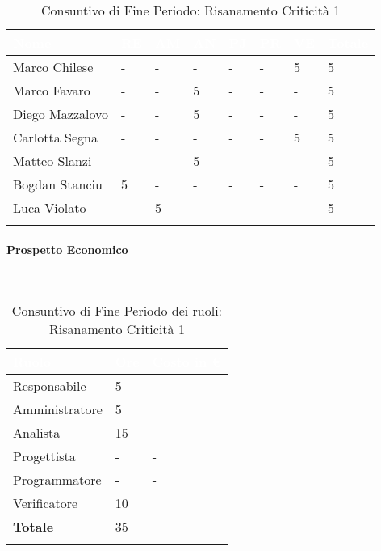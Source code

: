 \begin{longtable}{|C{.30\textwidth}|C{.06\textwidth}|C{.06\textwidth}|C{.06\textwidth} | C{.06\textwidth}| C{.06\textwidth} | C{.06\textwidth} | C{.10\textwidth} |}
\hline
{}	\textbf{\textcolor{white}{Nome}} & \textbf{\textcolor{white}{RE}} & \textbf{\textcolor{white}{AM}} & \textbf{\textcolor{white}{AN}} & \textbf{\textcolor{white}{PJ}} & \textbf{\textcolor{white}{PR}} & \textbf{\textcolor{white}{VE}} & \textbf{\textcolor{white}{Totale}}\\
\hline 
Marco Chilese & - & - & - & - & - & 5 & 5 \\
\hline
{}Marco Favaro & - & - & 5 & - & - & - & 5 \\
\hline
Diego Mazzalovo & - & - & 5 & - & - & - & 5 \\
\hline
{}Carlotta Segna & - & - & - & - & - & 5 & 5 \\
\hline
Matteo Slanzi & - & - & 5 & - & - & - & 5 \\
\hline
{}Bogdan Stanciu & 5 & - & - & - & - & - & 5 \\
\hline
Luca Violato & - & 5 & - & - & - & - & 5 \\
\hline

\caption{Consuntivo di Fine Periodo: Risanamento Criticità 1}
\label{Distribuzione oraria del periodo di rc1}
\end{longtable}

\paragraph{Prospetto Economico} \-\\

\begin{longtable}{| C{.30\textwidth}| C{.15\textwidth}| C{.20\textwidth}|}
\hline
{}\textbf{\textcolor{white}{Ruolo}} & \textbf{\textcolor{white}{Ore}} & \textbf{\textcolor{white}{Costo in \euro}} \\
\hline 
Responsabile & 5 &  \\
\hline
{}Amministratore & 5 &  \\
\hline
Analista & 15 &  \\
\hline
{}Progettista & - & - \\
\hline
Programmatore & - & - \\
\hline
{}Verificatore & 10 & \\
\hline
\textbf{Totale} & 35 &  \\
\hline
\caption{Consuntivo di Fine Periodo dei ruoli: Risanamento Criticità 1}
\label{Distribuzione oraria ruoli del periodo di rc1}
\end{longtable}


